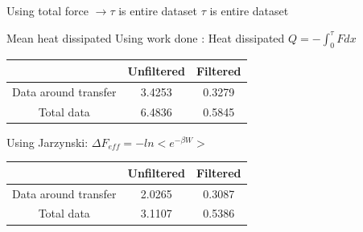 \documentclass{beamer}
\begin{document}
\begin{frame}{Using total force $\rightarrow \tau$ is entire dataset}
$\tau$ is entire dataset
\begin{table}[h!]
\end{table}

\end{frame}

\begin{frame}{Mean heat dissipated}
Using work done : Heat dissipated $Q=-\int_{0}^{\tau} Fdx$
\begin{center} 
\begin{tabular}{| c | c | c |} 
\hline  & Unfiltered & Filtered \\ 
\hline Data around transfer & 3.4253 & 0.3279  \\ 
\hline Total data & 6.4836 & 0.5845 \\ 
\hline 
\end{tabular} 
\end{center}

Using Jarzynski: $\Delta F_{eff}= -ln<e^{-\beta W}>$
\begin{center} 
\begin{tabular}{| c | c | c |} 
\hline  & Unfiltered & Filtered \\ 
\hline Data around transfer & 2.0265 & 0.3087  \\ 
\hline Total data & 3.1107 & 0.5386 \\ 
\hline 
\end{tabular} 
\end{center}


\end{frame}




\end{document}

